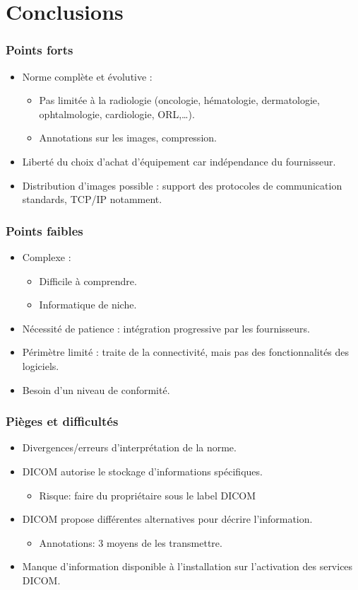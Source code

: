 \section{Conclusions}

\frame
{
	\frametitle{Points forts}
	\begin{itemize}
		\item Norme compl\`ete et \'evolutive :
		\begin{itemize}
			\item<2-> Pas limit\'ee \`a la radiologie (oncologie, h\'ematologie, dermatologie, ophtalmologie, cardiologie, ORL,\ldots).
			\item<3-> Annotations sur les images, compression.
		\end{itemize}
		\item<4-> Libert\'e du choix d'achat d'\'equipement car ind\'ependance du fournisseur.
		\item<5-> Distribution d'images possible : support des protocoles de communication standards, TCP/IP notamment.
	\end{itemize}
}

\frame
{
	\frametitle{Points faibles}
	\begin{itemize}
		\item Complexe :
		\begin{itemize}
			\item<2-> Difficile \`a comprendre.
			\item<3-> Informatique de niche.
		\end{itemize}
		\item<4-> N\'ecessit\'e de patience : int\'egration progressive par les fournisseurs.
		\item<5-> P\'erim\`etre limit\'e : traite de la connectivit\'e, mais pas des fonctionnalit\'es des logiciels.
		\item<6-> Besoin d'un niveau de conformit\'e.
	\end{itemize}
}

\frame
{
	\frametitle{Pi\`eges et difficult\'es}
	\begin{itemize}
		\item Divergences/erreurs d'interpr\'etation de la norme.
		\item<2-> DICOM autorise le stockage d'informations sp\'ecifiques.
		\begin{itemize}
			\item<3-> Risque: faire du propri\'etaire sous le label DICOM
		\end{itemize}
		\item<4-> DICOM propose diff\'erentes alternatives pour d\'ecrire l'information.
		\begin{itemize}
			\item<5-> Annotations: 3 moyens de les transmettre.
		\end{itemize}
		\item<6-> Manque d'information disponible \`a l'installation sur l'activation des services DICOM.
	\end{itemize}
}

